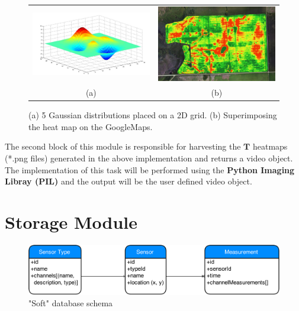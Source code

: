 \documentclass{article}
\begin{document}
\begin{figure}[!htbp]
\begin{center}
\begin{tabular}{c c}
\includegraphics[width=0.45\linewidth]{Images/multipleGaus.jpg}&
\includegraphics[width=0.45\linewidth]{Images/HeatMap.jpg}\\
(a) & (b)
\end{tabular}
\end{center}
\vspace{-0.15in}
\caption{\label{fig:Analytics} {(a) 5 Gaussian distributions placed on a 2D grid. (b) Superimposing the heat map on the GoogleMaps. }}
\end{figure}

The second block of this module is responsible for harvesting the $\mathbf{T}$ heatmaps (*.png files) generated in the above implementation and returns a video object. The implementation of this task will be performed using the \textbf{Python Imaging Libray (PIL)} and the output will be the user defined video object. 


\section{Storage Module}

\begin{figure}[htb]
\begin{center}
   \includegraphics[width=1\linewidth]{Images/DB-Schema.png}
\end{center}
\vspace{-0.2in}
   \caption{"Soft" database schema}
   \label{fig:db-soft-schema}
\end{figure}
\end{document}
